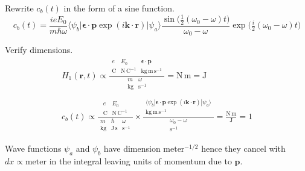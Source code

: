 Rewrite $c_b(t)$ in the form of a sine function.
\begin{equation*}
c_b(t)=\frac{ieE_0}{m\hbar\omega}
\langle\psi_b|\boldsymbol{\epsilon}\cdot\mathbf p\exp(i\mathbf k\cdot\mathbf r)|\psi_a\rangle
\frac{\sin\bigl(\tfrac{1}{2}(\omega_0-\omega)t\bigr)}{\omega_0-\omega}
\exp\bigl(\tfrac{i}{2}(\omega_0-\omega)t\bigr)
\tag{2}
\end{equation*}

Verify dimensions.
\begin{gather*}
H_1(\mathbf r,t)
\propto\frac{
\begin{matrix}
e & E_0 & \boldsymbol{\epsilon}\cdot\mathbf p
\\
\text{C}
& \text{N}\,\text{C}^{-1}
& \text{kg}\,\text{m}\,\text{s}^{-1}
\end{matrix}
}{
\begin{matrix}
m & \omega
\\
\text{kg} & \text{s}^{-1}
\end{matrix}
}=\text{N}\,\text{m}=\text{J}
\\ %
c_b(t)\propto\frac{
\begin{matrix}
e & E_0
\\
\text{C} & \text{N}\,\text{C}^{-1}
\end{matrix}
}{
\begin{matrix}
m & \hbar & \omega
\\
\text{kg} & \text{J}\,\text{s} & \text{s}^{-1}
\end{matrix}
}
\times
\frac{
\begin{matrix}
\\
\langle\psi_b|\boldsymbol{\epsilon}\cdot\mathbf p\exp(i\mathbf k\cdot\mathbf r)|\psi_a\rangle
\\
\text{kg}\,\text{m}\,\text{s}^{-1}
\end{matrix}
}{
\begin{matrix}
\omega_0-\omega
\\
\text{s}^{-1}
\end{matrix}
}
=\frac{\text{N}\,\text{m}}{\text{J}}=1
\end{gather*}

Wave functions $\psi_a$ and $\psi_b$ have dimension $\text{meter}^{-1/2}$
hence they cancel with $dx\propto\text{meter}$ in the integral leaving
units of momentum due to $\mathbf p$.


